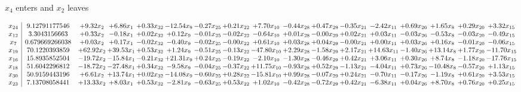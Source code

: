 \documentclass[9pt]{article}
\begin{document}
 $ x_{4} $ enters and $ x_{2} $ leaves 

 \[\begin{array}{c| c c@{\hskip 2pt} c@{\hskip 2pt} c@{\hskip 2pt} c@{\hskip 2pt} c@{\hskip 2pt} c@{\hskip 2pt} c@{\hskip 2pt} c@{\hskip 2pt} c@{\hskip 2pt} c@{\hskip 2pt} c@{\hskip 2pt} c@{\hskip 2pt} c@{\hskip 2pt} c@{\hskip 2pt} c@{\hskip 2pt} }
 x_{24}   &  9.12791177546 & +  9.32 x_{2} & +  6.86 x_{1} & +  0.33 x_{32} & -12.54 x_{9} & -0.27 x_{25} & +  0.21 x_{22} & +  7.70 x_{10} & -0.44 x_{28} & +  0.47 x_{29} & -0.35 x_{21} & -2.42 x_{11} & +  0.69 x_{26} & +  1.65 x_{8} & +  0.29 x_{20} & +  3.32 x_{15}\\
 x_{12}   &  3.3043156663 & +  0.33 x_{2} & -0.18 x_{1} & +  0.02 x_{32} & +  0.12 x_{9} & -0.01 x_{25} & -0.02 x_{22} & -0.64 x_{10} & +  0.01 x_{28} & -0.00 x_{29} & +  0.02 x_{21} & +  0.03 x_{11} & -0.03 x_{26} & -0.53 x_{8} & -0.03 x_{20} & -0.49 x_{15}\\
 x_{7}   &  0.679669266038 & +  0.03 x_{2} & +  0.17 x_{1} & -0.02 x_{32} & -0.40 x_{9} & -0.02 x_{25} & -0.00 x_{22} & +  0.61 x_{10} & +  0.03 x_{28} & +  0.04 x_{29} & -0.00 x_{21} & +  0.00 x_{11} & +  0.03 x_{26} & +  0.16 x_{8} & -0.01 x_{20} & -0.06 x_{15}\\
 x_{19}   &  70.1220393859 & + 62.92 x_{2} & + 39.53 x_{1} & +  0.53 x_{32} & +  1.24 x_{9} & -0.51 x_{25} & -0.13 x_{22} & -47.80 x_{10} & +  2.29 x_{28} & -1.58 x_{29} & +  2.17 x_{21} & + 14.63 x_{11} & -1.40 x_{26} & + 13.14 x_{8} & +  1.77 x_{20} & -11.70 x_{15}\\
 x_{16}   &  15.8935852504 & -19.72 x_{2} & -15.84 x_{1} & -0.21 x_{32} & + 21.31 x_{9} & +  0.24 x_{25} & -0.19 x_{22} & -2.10 x_{10} & -1.30 x_{28} & -0.46 x_{29} & +  0.42 x_{21} & +  3.06 x_{11} & +  0.30 x_{26} & +  8.74 x_{8} & -1.18 x_{20} & -17.76 x_{15}\\
 x_{18}   &  51.6042296812 & -18.72 x_{2} & -27.48 x_{1} & +  0.34 x_{32} & -9.58 x_{9} & -0.04 x_{25} & -0.37 x_{22} & + 11.75 x_{10} & -0.93 x_{28} & +  0.52 x_{29} & -1.13 x_{21} & -4.04 x_{11} & +  0.73 x_{26} & -10.48 x_{8} & -0.57 x_{20} & +  1.13 x_{15}\\
 x_{30}   &  50.9159443196 & +  6.61 x_{2} & + 13.74 x_{1} & +  0.02 x_{32} & -14.08 x_{9} & -0.60 x_{25} & +  0.28 x_{22} & -15.81 x_{10} & +  0.99 x_{28} & -0.07 x_{29} & +  0.24 x_{21} & -0.70 x_{11} & -0.17 x_{26} & -1.19 x_{8} & +  0.61 x_{20} & +  3.53 x_{15}\\
 x_{23}   &  7.13708058441 & + 13.33 x_{2} & +  8.03 x_{1} & +  0.53 x_{32} & -2.81 x_{9} & -0.63 x_{25} & +  0.53 x_{22} & +  1.02 x_{10} & -0.42 x_{28} & -0.72 x_{29} & +  0.42 x_{21} & -6.38 x_{11} & +  0.04 x_{26} & +  8.70 x_{8} & +  0.76 x_{20} & +  0.25 x_{15}\\

\end{array}\]
\end{document}
